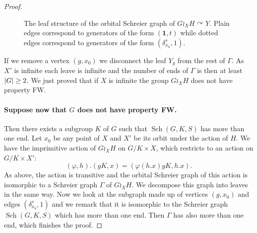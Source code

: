 \documentclass[a4paper]{article}
\theoremstyle{definition}
\theoremstyle{remark}%
\DeclareMathOperator\Sch{Sch}
\DeclarePairedDelimiter\abs{\lvert}{\rvert}
\begin{document}
\begin{proof}
\begin{figure}[htbp]
\caption{The leaf structure of the orbital Schreier graph of $G\wr_XH \curvearrowright Y$. Plain edges correspond to generators of the form $(\mathbf 1,t)$ while dotted edges correspond to generators of the form $(\delta_{x_0}^s,1)$.}
\label{Figure:Leaves}
\end{figure}
%
%

If we remove a vertex $(g,x_0)$ we disconnect the leaf $Y_g$ from the rest of $\Gamma$. As $X'$ is infinite each leave is infinite and the number of ends of $\Gamma$ is then at least $\abs{G}\geq 2$. We just proved that if $X$ is infinite the group $G\wr_XH$ does not have property FW.
%
%
%
\paragraph{Suppose now that $G$ does not have property FW.} Then there exists a subgroup $K$ of $G$ such that $\Sch(G,K,S)$ has more than one end.
Let $x_0$ be any point of $X$ and $X'$ be its orbit under the action of $H$.
We have the imprimitive action of $G\wr_XH$ on $G/K\times X$, which restricts to an action on $G/K\times X'$:
\[
	(\varphi,h).(gK,x) = (\varphi(h.x) gK, h.x).
\]
As above, the action is transitive and the orbital Schreier graph of this action is isomorphic to a Schreier graph $\Gamma$ of $G\wr_XH$. We decompose this graph into leaves in the same way. Now we look at the subgraph made up of vertices $(g,x_0)$ and edges $(\delta_{x_0}^s,1)$ and we remark that it is isomorphic to the Schreier graph $\Sch(G,K,S)$ which has more than one end. Then $\Gamma$ has also more than one end, which finishes the proof.
\end{proof}
%
%
%
%
%
%
%
%
%
%
%
%
\end{document}
